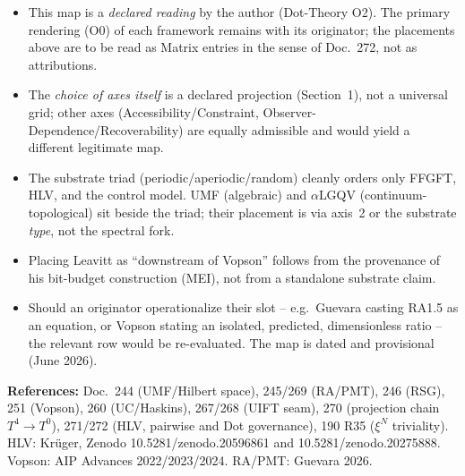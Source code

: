 \begin{itemize}
  \item This map is a \emph{declared reading} by the author (Dot-Theory O2). The primary rendering
        (O0) of each framework remains with its originator; the placements above are to be read as
        Matrix entries in the sense of Doc.~272, not as attributions.
  \item The \emph{choice of axes itself} is a declared projection (Section~1), not a universal grid;
        other axes (Accessibility/Constraint, Observer-Dependence/Recoverability) are equally
        admissible and would yield a different legitimate map.
  \item The substrate triad (periodic/aperiodic/random) cleanly orders only FFGFT, HLV, and the
        control model. UMF (algebraic) and $\alpha$LGQV (continuum-topological) sit beside the
        triad; their placement is via axis~2 or the substrate \emph{type}, not the spectral fork.
  \item Placing Leavitt as \enquote{downstream of Vopson} follows from the provenance of his
        bit-budget construction (MEI), not from a standalone substrate claim.
  \item Should an originator operationalize their slot -- e.g.\ Guevara casting RA1.5 as an
        equation, or Vopson stating an isolated, predicted, dimensionless ratio -- the relevant
        row would be re-evaluated. The map is dated and provisional (June 2026).
\end{itemize}

\noindent\textbf{References:} Doc.~244 (UMF/Hilbert space), 245/269 (RA/PMT), 246 (RSG),
251 (Vopson), 260 (UC/Haskins), 267/268 (UIFT seam), 270 (projection chain $T^4\!\to\!T^0$),
271/272 (HLV, pairwise and Dot governance), 190 R35 ($\xi^N$ triviality).
HLV: Krüger, Zenodo 10.5281/zenodo.20596861 and 10.5281/zenodo.20275888.
Vopson: AIP Advances 2022/2023/2024. RA/PMT: Guevara 2026.

